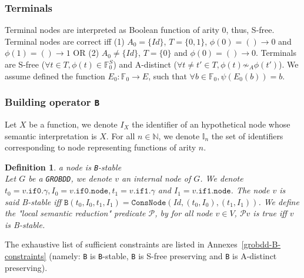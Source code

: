 \documentclass[a4paper,10pt]{article}
\newcommand{\N}{\mathbb{N}}%
\newcommand{\F}{\mathbb{F}}
\newcommand{\I}{\mathbb{I}}
\newcommand{\GroBdd}{\texttt{GROBDD}}
\newcommand{\fieldNode}{\texttt{node}}
\newcommand{\fieldGamma}{\mathtt{\gamma}}
\newcommand{\fieldThen}{\mathtt{if1}}
\newcommand{\fieldElse}{\mathtt{if0}}
\newtheorem{newdef}{Definition}
\newcommand{\definition}[2]{\begin{newdef}{#1\\}#2\end{newdef}}
\begin{document}
\subsubsection{Terminals}
Terminal nodes are interpreted as Boolean function of arity 0, thus, S-free.
Terminal nodes are correct iff (1) $A_0=\{Id\}$, $T=\{0, 1\}$, $\phi(0) = () \rightarrow 0$ and $\phi(1) = () \rightarrow 1$ OR (2) $A_0\neq\{Id\}$, $T=\{0\}$ and $\phi(0) = () \rightarrow 0$.
Terminals are S-free ($\forall t\in T, \phi(t)\in\F^S_0$) and A-distinct ($\forall t\neq t'\in T, \phi(t) \not\sim_A \phi(t')$).
We assume defined the function $E_0: \F_0 \longrightarrow E$, such that $\forall b\in\F_0, \psi(E_0(b)) = b$. 


\subsubsection{Building operator \texttt{B}}

Let $X$ be a function, we denote $I_X$ the identifier of an hypothetical node whose semantic interpretation is $X$.
For all $n\in\N$, we denote $\I_n$ the set of identifiers corresponding to node representing functions of arity $n$.

\definition{a node is \texttt{B}-stable}
{
Let $G$ be a \GroBdd{}, we denote $v$ an internal node of $G$.
We denote $t_0 = v.\fieldElse{}.\fieldGamma{}, I_0 = v.\fieldElse{}.\fieldNode{}, t_1 = v.\fieldThen{}.\fieldGamma{}$ and $I_1 = v.\fieldThen{}.\fieldNode{}$.
The node $v$ is said B-stable iff $\mathtt{B}(t_0, I_0, t_1, I_1) = \mathtt{ConsNode}(Id, (t_0, I_0), (t_1, I_1))$.
We define the "local semantic reduction" predicate $\mathcal{P}$, by for all node $v\in V$, $\mathcal{P} v$ is true iff $v$ is B-stable.
}

The exhaustive list of sufficient constraints are listed in Annexes~\ref{grobdd-B-constraints} (namely: \texttt{B} is \texttt{B}-stable, \texttt{B} is S-free preserving and \texttt{B} is A-distinct preserving).
\end{document}

